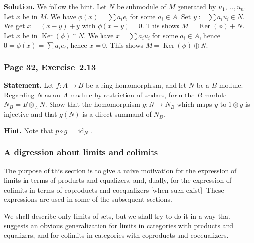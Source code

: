 \documentclass[12pt,letterpaper]{article}%
\newcommand{\oo}{\operatorname}\newcommand{\ooo}{\operatorname*}
\newcommand{\Ker}{\operatorname{Ker}}\newcommand{\Coker}{\operatorname{Coker}}
\newcommand{\nn}{\noindent}
\begin{document}
\nn\textbf{Solution.} We follow the hint. Let $N$ be submodule of $M$ generated by $u_1,\ldots,u_n$. Let $x$ be in $M$. We have $\phi(x)=\sum a_ie_i$ for some $a_i\in A$. Set $y:=\sum a_iu_i\in N$. We get $x=(x-y)+y$ with $\phi(x-y)=0$. This shows $M=\Ker(\phi)+N$. Let $x$ be in $\Ker(\phi)\cap N$. We have $x=\sum a_iu_i$ for some $a_i\in A$, hence $0=\phi(x)=\sum a_ie_i$, hence $x=0$. This shows $M=\Ker(\phi)\oplus N$.

\subsubsection{Page 32, Exercise~2.13}\label{ex2.13}%

\textbf{Statement.} Let $f:A\to B$ be a ring homomorphism, and let $N$ be a $B$-module. Regarding $N$ as an $A$-module by restriction of scalars, form the $B$-module $N_B=B\otimes_AN$. Show that the homomorphism $g:N\to N_B$ which maps $y$ to $1\otimes y$ is injective and that $g(N)$ is a direct summand of $N_B$.

\nn[Define $p:N_B\to N$ by $p(b\otimes y)=by$, and show that $N_B=\oo{Im}(g)\oplus\Ker(p)$.]

\nn\textbf{Hint.} Note that $p\circ g=\oo{id}_N$.

\subsubsection{A digression about limits and colimits}\label{lim}%

The purpose of this section is to give a naive motivation for the expression of limits in terms of products and equalizers, and, dually, for the expression of colimits in terms of coproducts and coequalizers [when such exist]. These expressions are used in some of the subsequent sections.

We shall describe only limits of sets, but we shall try to do it in a way that suggests an obvious generalization for limits in categories with products and equalizers, and for colimits in categories with coproducts and coequalizers.%
\end{document}
